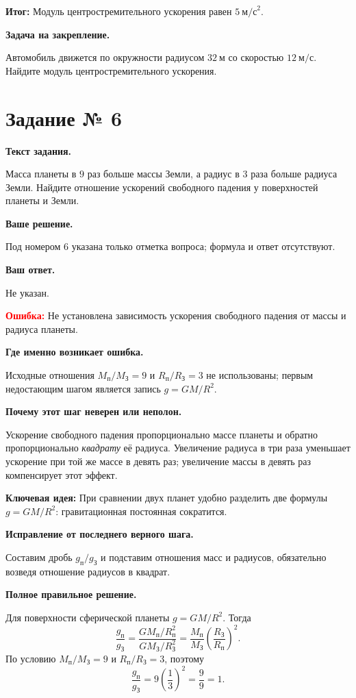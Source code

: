 \documentclass[11pt,a4paper]{article}
\newcommand{\reviewblock}[2]{\par\medskip\noindent\textbf{#1}\par\noindent#2\par}
\newcommand{\errorblock}[1]{\par\medskip\noindent\textcolor{red}{\textbf{Ошибка:}} #1\par}
\newcommand{\ideablock}[1]{\par\medskip\noindent\textcolor{blue!60!black}{\textbf{Ключевая идея:}} #1\par}
\newcommand{\resultblock}[1]{\par\medskip\noindent\textcolor{teal!60!black}{\textbf{Итог:}} #1\par}
\begin{document}
\resultblock{Модуль центростремительного ускорения равен $5\ \text{м/с}^2$.}

\reviewblock{Задача на закрепление.}{Автомобиль движется по окружности радиусом $32\ \text{м}$ со скоростью $12\ \text{м/с}$. Найдите модуль центростремительного ускорения.}
\newpage
{}\label{task:6}

\section*{Задание № 6}

\reviewblock{Текст задания.}{Масса планеты в $9$ раз больше массы Земли, а радиус в $3$ раза больше радиуса Земли. Найдите отношение ускорений свободного падения у поверхностей планеты и Земли.}

\reviewblock{Ваше решение.}{Под номером 6 указана только отметка вопроса; формула и ответ отсутствуют.}

\reviewblock{Ваш ответ.}{Не указан.}

\errorblock{Не установлена зависимость ускорения свободного падения от массы и радиуса планеты.}

\reviewblock{Где именно возникает ошибка.}{Исходные отношения $M_{\text{п}}/M_{\text{З}}=9$ и $R_{\text{п}}/R_{\text{З}}=3$ не использованы; первым недостающим шагом является запись $g=GM/R^2$.}

\reviewblock{Почему этот шаг неверен или неполон.}{Ускорение свободного падения пропорционально массе планеты и обратно пропорционально \emph{квадрату} её радиуса. Увеличение радиуса в три раза уменьшает ускорение при той же массе в девять раз; увеличение массы в девять раз компенсирует этот эффект.}

\ideablock{При сравнении двух планет удобно разделить две формулы $g=GM/R^2$: гравитационная постоянная сократится.}

\reviewblock{Исправление от последнего верного шага.}{Составим дробь $g_{\text{п}}/g_{\text{З}}$ и подставим отношения масс и радиусов, обязательно возведя отношение радиусов в квадрат.}

\reviewblock{Полное правильное решение.}{Для поверхности сферической планеты $g=GM/R^2$. Тогда
\[\frac{g_{\text{п}}}{g_{\text{З}}}=\frac{GM_{\text{п}}/R_{\text{п}}^2}{GM_{\text{З}}/R_{\text{З}}^2}=\frac{M_{\text{п}}}{M_{\text{З}}}\left(\frac{R_{\text{З}}}{R_{\text{п}}}\right)^2.\]
По условию $M_{\text{п}}/M_{\text{З}}=9$ и $R_{\text{п}}/R_{\text{З}}=3$, поэтому
\[\frac{g_{\text{п}}}{g_{\text{З}}}=9\left(\frac13\right)^2=\frac99=1.\]}
\end{document}
